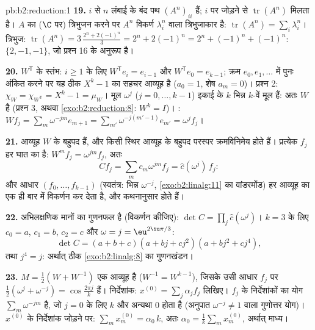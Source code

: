 \begin{solution}{pb:b2:reduction:1}
\textbf{19.} $i$ से $n$ लंबाई के बंद पथ $(A^n)_{ii}$ हैं; $i$ पर जोड़ने से $\operatorname{tr}(A^n)$
मिलता है। $A$ का ($\C$ पर) त्रिभुजन करने पर $A^n$ विकर्ण $\lambda_i^n$ वाला
त्रिभुजाकार है: $\operatorname{tr}(A^n) = \sum_i\lambda_i^n$। त्रिभुज: $\operatorname{tr}(A^n) = 3\,\frac{2^n + 2(-1)^n}3 =
2^n + 2(-1)^n = 2^n + (-1)^n + (-1)^n$:  $\{2, -1,
-1\}$, जो प्रश्न 16 के
अनुरूप है।

\textbf{20.} $W^{\mathsf T}$ के स्तंभ: $i \geq 1$ के लिए $W^{\mathsf T}e_i =
e_{i-1}$ और $W^{\mathsf T}e_0 = e_{k-1}$; क्रम $e_0, e_1, \dots$ में पुनः
अंकित करने पर यह ठीक $X^k - 1$ का सहचर आव्यूह है ($a_0 = 1$, शेष $a_m = 0$)। प्रश्न 2:
$\chi_{W} = \chi_{W^{\mathsf T}} = X^k - 1 =
\mu_{W}$। मूल $\omega^j$ ($j = 0, \dots, k-1$) इकाई के $k$ भिन्न $k$-वें मूल हैं: अतः $W$
 है (प्रश्न 3, अथवा \cref{exo:b2:reduction:8}: $W^k = I$)। : $Wf_j
= \sum_m \omega^{-jm}e_{m+1} = \sum_{m'}\omega^{-j(m'-1)}e_{m'}
= \omega^j f_j$।

\textbf{21.}  आव्यूह $W$ के बहुपद हैं, और किसी स्थिर आव्यूह के
बहुपद परस्पर क्रमविनिमेय होते हैं। प्रत्येक $f_j$ हर घात का  है: $W^m f_j = \omega^{jm}f_j$, अतः
\[
Cf_j = \sum_m c_m\omega^{jm} f_j = \widehat c(\omega^j)\,f_j :
\]
और आधार $(f_0, \dots, f_{k-1})$ (स्वतंत्र: भिन्न $\omega^{-j}$, \cref{exo:b2:linalg:11} का वांडरमोंड) हर  आव्यूह
का एक ही बार में विकर्णन कर देता है, और  कथनानुसार होते
हैं।

\textbf{22.}  अभिलक्षणिक मानों का गुणनफल है (विकर्णन कीजिए):
$\det C = \prod_{j}\widehat c(\omega^j)$। $k
= 3$ के लिए $c_0 = a$, $c_1 = b$, $c_2 = c$ और $\omega = j =
\eu^{2\iu\pi/3}$:
\[
\det C = (a + b + c)(a + bj + cj^2)(a + bj^2 + cj^4),
\]
तथा $j^4 = j$: अर्थात् ठीक \cref{exo:b2:linalg:8} का गुणनखंडन।

\textbf{23.} $M = \frac12(W + W^{-1})$ एक  आव्यूह है ($W^{-1} =
W^{k-1}$), जिसके  उसी
आधार $f_j$ पर $\frac12(\omega^j + \omega^{-j}) =
\cos\frac{2\pi j}k$ हैं। निर्देशांक: $x^{(0)} = \sum_j \alpha_j f_j$ लिखिए। $f_j$ के निर्देशांकों का योग
$\sum_m \omega^{-jm}$ है, जो $j = 0$ के लिए $k$ और अन्यथा $0$ होता है (अनुपात $\omega^{-j} \neq 1$ वाला
गुणोत्तर योग)। $x^{(0)}$ के निर्देशांक जोड़ने पर: $\sum_m x^{(0)}_m =
\alpha_0\,k$, अतः $\alpha_0 = \frac1k\sum_m x^{(0)}_m$, अर्थात्
माध्य।


\end{solution}
